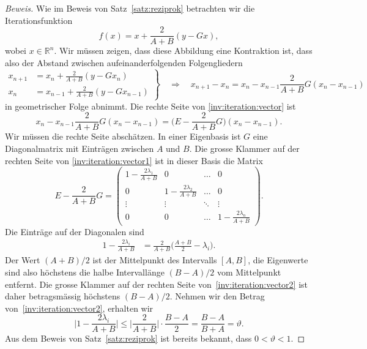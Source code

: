 \begin{proof}[Beweis]
Wie im Beweis von Satz~\ref{satz:reziprok} betrachten wir die
Iterationsfunktion
\[
f(x) = x + \frac{2}{A+B}(y-Gx),
\]
wobei $x\in\mathbb R^n$.
Wir müssen zeigen, dass diese Abbildung eine Kontraktion ist, dass
also der Abstand zwischen aufeinanderfolgenden Folgengliedern 
\begin{equation}
\left.
\begin{aligned}
x_{n+1} &= x_n + \frac{2}{A+B}(y-Gx_n)
\\
x_n &= x_{n-1} + \frac{2}{A+B}(y-Gx_{n-1})
\end{aligned}
\right\}
\quad
\Rightarrow
\quad
x_{n+1}- x_{n}
=
x_n-x_{n-1} \frac{2}{A+B}G(x_n-x_{n-1})
\label{inv:iteration:vector}
\end{equation}
in geometrischer Folge abnimmt.
Die rechte Seite von \eqref{inv:iteration:vector}
ist
\begin{equation}
x_n-x_{n-1} \frac{2}{A+B}G(x_n-x_{n-1})
=
\biggl(E-\frac{2}{A+B}G\biggr) (x_n-x_{n-1}).
\label{inv:iteration:vector1}
\end{equation}
Wir müssen die rechte Seite abschätzen.
In einer Eigenbasis ist $G$ eine Diagonalmatrix mit Einträgen zwischen
$A$ und $B$.
Die grosse Klammer auf der rechten Seite von \eqref{inv:iteration:vector1}
ist in dieser Basis die Matrix
\[
E-\frac{2}{A+B}G
=
\begin{pmatrix}
1-\frac{2\lambda_1}{A+B} &            0             &\dots &        0         \\
          0              & 1-\frac{2\lambda_2}{A+B} &\dots &        0         \\
      \vdots             &          \vdots          &\ddots&     \vdots       \\
          0              &            0             &\dots & 1-\frac{2\lambda_n}{A+B}
\end{pmatrix}.
\]
Die Einträge auf der Diagonalen sind
\begin{align}
1-
\frac{2 \lambda_i }{A+B}
&=
\frac{2}{A+B}
\biggl(
\frac{A+B}2 - \lambda_i
\biggr).
\label{inv:iteration:vector2}
\end{align}
Der Wert $(A+B)/2$ ist der Mittelpunkt des Intervalls $[A,B]$, die Eigenwerte
sind also höchstens die halbe Intervallänge $(B-A)/2$ vom Mittelpunkt
entfernt.
Die grosse Klammer auf der rechten Seite von~\eqref{inv:iteration:vector2}
ist daher betragsmässig höchstens $(B-A)/2$.
Nehmen wir den Betrag von~\eqref{inv:iteration:vector2}, erhalten wir
\[
\biggl|
1-
\frac{2 \lambda_i }{A+B}
\biggr|
\le 
\biggl|
\frac2{A+B}
\biggr|
\cdot \frac{B-A}2
=
\frac{B-A}{B+A}=\vartheta.
\]
Aus dem Beweis von Satz~\ref{satz:reziprok} ist bereits bekannt, dass
$0<\vartheta < 1$.


\end{proof}
